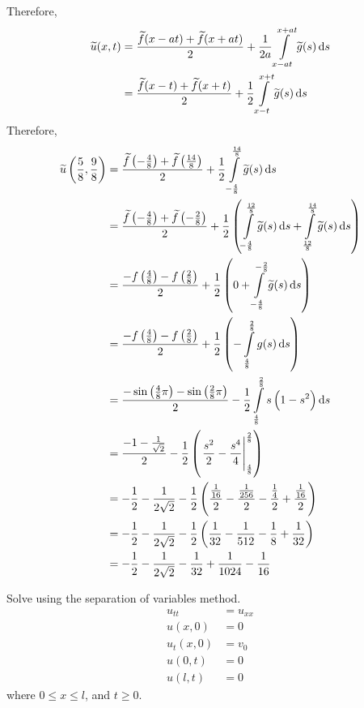 \documentclass[fleqn, a4paper, 11pt, oneside]{amsart}
\theoremstyle{definition}
\theoremstyle{theorem}
\renewcommand{\tilde}{\widetilde}
\begin{document}
\begin{solution}
\begin{enumerate}[leftmargin=*]
			Therefore,
			\begin{align*}
				\tilde{u}(x,t) &= \frac{\tilde{f}(x - a t) + \tilde{f}(x + a t)}{2} + \frac{1}{2 a} \int\limits_{x - a t}^{x + a t} \tilde{g}(s) \dif s\\
				&= \frac{\tilde{f}(x - t) + \tilde{f}(x + t)}{2} + \frac{1}{2} \int\limits_{x - t}^{x + t} \tilde{g}(s) \dif s
			\end{align*}
			Therefore,
			\begin{align*}
				\tilde{u}\left( \frac{5}{8},\frac{9}{8} \right) &= \frac{\tilde{f}\left( -\frac{4}{8} \right) + \tilde{f}\left( \frac{14}{8} \right)}{2} + \frac{1}{2} \int\limits_{-\frac{4}{8}}^{\frac{14}{8}} \tilde{g}(s) \dif s\\
				&= \frac{\tilde{f}\left( -\frac{4}{8} \right) + \tilde{f}\left( -\frac{2}{8} \right)}{2} + \frac{1}{2} \left( \int\limits_{-\frac{4}{8}}^{\frac{12}{8}} \tilde{g}(s) \dif s + \int\limits_{\frac{12}{8}}^{\frac{14}{8}} \tilde{g}(s) \dif s \right)\\
				&= \frac{-f\left( \frac{4}{8} \right) - f\left( \frac{2}{8} \right)}{2} + \frac{1}{2} \left( 0 + \int\limits_{-\frac{4}{8}}^{-\frac{2}{8}} \tilde{g}(s) \dif s \right)\\
				&= \frac{-f\left( \frac{4}{8} \right) - f\left( \frac{2}{8} \right)}{2} + \frac{1}{2} \left( -\int\limits_{\frac{4}{8}}^{\frac{2}{8}} g(s) \dif s \right)\\
				&= \frac{-\sin\left( \frac{4}{8} \pi \right) - \sin\left( \frac{2}{8} \pi \right)}{2} - \frac{1}{2} \int\limits_{\frac{4}{8}}^{\frac{2}{8}} s \left( 1 - s^2 \right) \dif s\\
				&= \frac{-1 - \frac{1}{\sqrt{2}}}{2} - \frac{1}{2} \left( \left. \frac{s^2}{2} - \frac{s^4}{4} \right|_{\frac{4}{8}}^{\frac{2}{8}} \right)\\
				&= -\frac{1}{2} - \frac{1}{2 \sqrt{2}} - \frac{1}{2} \left( \frac{\frac{1}{16}}{2} - \frac{\frac{1}{256}}{2} - \frac{\frac{1}{4}}{2} + \frac{\frac{1}{16}}{2} \right)\\
				&= -\frac{1}{2} - \frac{1}{2 \sqrt{2}} - \frac{1}{2} \left( \frac{1}{32} - \frac{1}{512} - \frac{1}{8} + \frac{1}{32} \right)\\
				&= -\frac{1}{2} - \frac{1}{2 \sqrt{2}} - \frac{1}{32} + \frac{1}{1024} - \frac{1}{16}
			\end{align*}
	\end{enumerate}
\end{solution}

\begin{question}
	Solve using the separation of variables method.
	\begin{align*}
		u_{t t}  & = u_{x x} \\
		u(x,0)   & = 0       \\
		u_t(x,0) & = v_0     \\
		u(0,t)   & = 0       \\
		u(l,t)   & = 0
	\end{align*}
	where $0 \le x \le l$, and $t \ge 0$.
\end{question}
\end{document}
